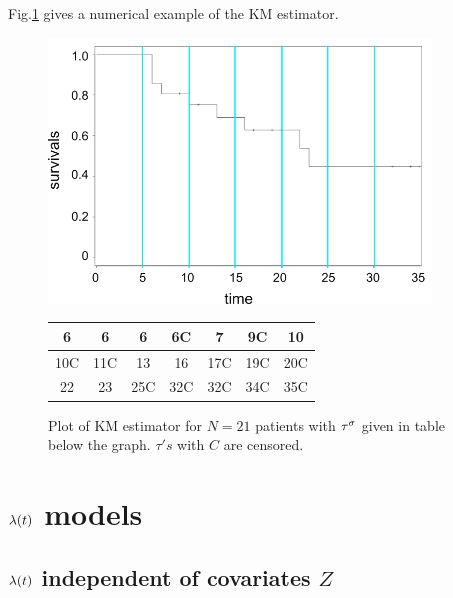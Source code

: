 Fig.\ref{fig-kn-graph} gives a numerical
example of the
 KM estimator.

 \begin{figure}[h!]
\centering
\includegraphics[width=4in]
{survival/km-graph.png}
\begin{tabular}{|c|c|c|c|c|c|c|}
\hline\hline
6& 6& 6& 6C& 7& 9C& 10\\
\hline
10C&11C& 13& 16& 17C& 19C& 20C\\
\hline
 22& 23& 25C& 32C& 32C& 34C& 35C\\
 \hline
 \end{tabular}
\caption{Plot of KM estimator for
$N=21$ patients
with $\tau^\sigma$ given in table
below the graph.
$\tau's$ with $C$
 are censored.}
\label{fig-kn-graph}
\end{figure}





\section{$\lambda(t)$ models}

\subsection{$\lambda(t)$  independent
of covariates $Z$}


